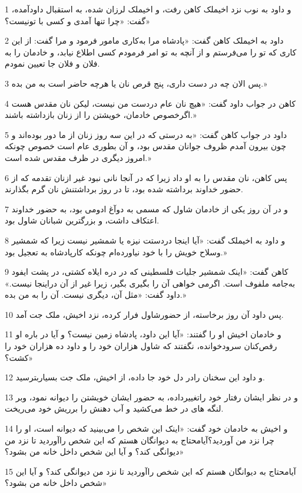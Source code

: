 \par 1 و داود به نوب نزد اخیملک کاهن رفت، و اخیملک لرزان شده، به استقبال داودآمده، گفت: «چرا تنها آمدی و کسی با تونیست؟»
\par 2 داود به اخیملک کاهن گفت: «پادشاه مرا به‌کاری مامور فرمود و مرا گفت: از این کاری که تو را می‌فرستم و از آنچه به تو امر فرمودم کسی اطلاع نیابد، و خادمان را به فلان و فلان جا تعیین نمودم.
\par 3 پس الان چه در دست داری، پنج قرص نان یا هر‌چه حاضر است به من بده.»
\par 4 کاهن در جواب داود گفت: «هیچ نان عام دردست من نیست، لیکن نان مقدس هست اگرخصوص خادمان، خویشتن را از زنان بازداشته باشند.»
\par 5 داود در جواب کاهن گفت: «به درستی که در این سه روز زنان از ما دور بوده‌اند و چون بیرون آمدم ظروف جوانان مقدس بود، و آن بطوری عام است خصوص چونکه امروز دیگری در ظرف مقدس شده است.»
\par 6 پس کاهن، نان مقدس را به او داد زیرا که در آنجا نانی نبود غیر ازنان تقدمه که از حضور خداوند برداشته شده بود، تا در روز برداشتنش نان گرم بگذارند.
\par 7 و در آن روز یکی از خادمان شاول که مسمی به دوآغ ادومی بود، به حضور خداوند اعتکاف داشت، و بزرگترین شبانان شاول بود.
\par 8 و داود به اخیملک گفت: «آیا اینجا دردستت نیزه یا شمشیر نیست زیرا که شمشیر وسلاح خویش را با خود نیاورده‌ام چونکه کارپادشاه به تعجیل بود.»
\par 9 کاهن گفت: «اینک شمشیر جلیات فلسطینی که در دره ایلاه کشتی، در پشت ایفود به‌جامه ملفوف است. اگرمی خواهی آن را بگیری بگیر، زیرا غیر از آن دراینجا نیست.» داود گفت: «مثل آن، دیگری نیست. آن را به من بده.»
\par 10 پس داود آن روز برخاسته، از حضورشاول فرار کرده، نزد اخیش، ملک جت آمد.
\par 11 و خادمان اخیش او را گفتند: «آیا این داود، پادشاه زمین نیست؟ و آیا در باره او رقص‌کنان سرودخوانده، نگفتند که شاول هزاران خود را و داود ده هزاران خود را کشت؟»
\par 12 و داود این سخنان رادر دل خود جا داده، از اخیش، ملک جت بسیاربترسید.
\par 13 و در نظر ایشان رفتار خود راتغییرداده، به حضور ایشان خویشتن را دیوانه نمود، وبر لنگه های در خط می‌کشید و آب دهنش را برریش خود می‌ریخت.
\par 14 و اخیش به خادمان خود گفت: «اینک این شخص را می‌بینید که دیوانه است، او را چرا نزد من آوردید؟آیامحتاج به دیوانگان هستم که این شخص راآوردید تا نزد من دیوانگی کند؟ و آیا این شخص داخل خانه من بشود؟»
\par 15 آیامحتاج به دیوانگان هستم که این شخص راآوردید تا نزد من دیوانگی کند؟ و آیا این شخص داخل خانه من بشود؟»
 
